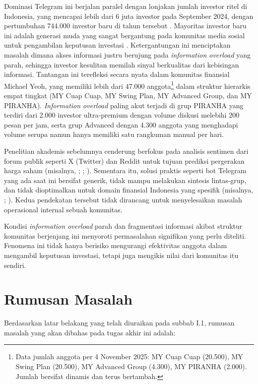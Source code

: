 Dominasi Telegram ini berjalan paralel dengan lonjakan jumlah investor ritel di Indonesia, yang mencapai lebih dari 6 juta investor pada September 2024, dengan pertumbuhan 744.000 investor baru di tahun tersebut \autocite{bei2024}. Mayoritas investor baru ini adalah generasi muda yang sangat bergantung pada komunitas media sosial untuk pengambilan keputusan investasi \autocite{ojk2022,jema2023}. Ketergantungan ini menciptakan masalah dimana akses informasi justru berujung pada \textit{information overload} yang parah, sehingga investor kesulitan memilah sinyal berkualitas dari kebisingan informasi. Tantangan ini terefleksi secara nyata dalam komunitas finansial Michael Yeoh, yang memiliki lebih dari 47.000 anggota\footnote{Data jumlah anggota per 4 November 2025: MY Cuap Cuap (20.500), MY Swing Plan (20.500), MY Advanced Group (4.300), MY PIRANHA (2.000). Jumlah bersifat dinamis dan terus bertambah.} dalam struktur hierarkis empat tingkat (MY Cuap Cuap, MY Swing Plan, MY Advanced Group, dan MY PIRANHA). \textit{Information overload} paling akut terjadi di grup PIRANHA yang terdiri dari 2.000 investor ultra-premium dengan volume diskusi melebihi 200 pesan per jam, serta grup Advanced dengan 4.300 anggota yang menghadapi volume serupa namun hanya memiliki satu rangkuman manual per hari.

Penelitian akademis sebelumnya cenderung berfokus pada analisis sentimen dari forum publik seperti X (Twitter) dan Reddit untuk tujuan prediksi pergerakan harga saham (misalnya, \textcite{bollen2011}; \textcite{sianipar2023}; \textcite{liew2021}). Sementara itu, solusi praktis seperti bot Telegram yang ada saat ini bersifat generik, tidak mampu melakukan sintesis lintas-grup, dan tidak dioptimalkan untuk domain finansial Indonesia yang spesifik (misalnya, \textcite{stars2023}; \textcite{panda2023}). Kedua pendekatan tersebut tidak dirancang untuk menyelesaikan masalah operasional internal sebuah komunitas.

Kondisi \textit{information overload} parah dan fragmentasi informasi akibat struktur komunitas berjenjang ini menyoroti permasalahan signifikan yang perlu diteliti. Fenomena ini tidak hanya berisiko mengurangi efektivitas anggota dalam mengambil keputusan investasi, tetapi juga mengikis nilai dari komunitas itu sendiri.

\section{Rumusan Masalah}
Berdasarkan latar belakang yang telah diuraikan pada subbab I.1, rumusan masalah yang akan dibahas pada tugas akhir ini adalah:

